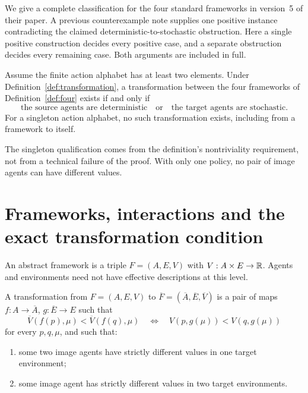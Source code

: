 \documentclass[11pt]{article}
\begin{document}
We give a complete classification for the four standard frameworks
in version~5 of their paper. A previous counterexample note
\cite{Counterexample} supplies one positive instance contradicting the
claimed deterministic-to-stochastic obstruction. Here a single positive
construction decides every positive case, and a separate obstruction
decides every remaining case. Both arguments are included in full.

\begin{theorem}[Classification]\label{thm:classification}
Assume the finite action alphabet has at least two elements. Under
Definition~\ref{def:transformation}, a transformation between the four
frameworks of Definition~\ref{def:four} exists if and only if
\[
 \text{the source agents are deterministic}
 \quad\text{or}\quad
 \text{the target agents are stochastic}.
\]
For a singleton action alphabet, no such transformation exists,
including from a framework to itself.
\end{theorem}

The singleton qualification comes from the definition's nontriviality
requirement, not from a technical failure of the proof. With only one
policy, no pair of image agents can have different values.

\section{Frameworks, interactions and the exact transformation condition}

An abstract framework is a triple $F=(A,E,V)$ with
$V:A\times E\to\mathbb R$. Agents and environments need not have effective
descriptions at this level.

\begin{definition}\label{def:transformation}
A transformation from $F=(A,E,V)$ to
$\overline F=(\overline A,\overline E,\overline V)$ is a pair of maps
$f:A\to\overline A$, $g:\overline E\to E$ such that
\begin{equation}\label{eq:faithful}
 \overline V(f(p),\mu)<\overline V(f(q),\mu)
 \quad\Longleftrightarrow\quad
 V(p,g(\mu))<V(q,g(\mu))
\end{equation}
for every $p,q,\mu$, and such that:
\begin{enumerate}
\item some two image agents have strictly different values in one
      target environment;
\item some image agent has strictly different values in two target
      environments.
\end{enumerate}
\end{definition}
\end{document}
